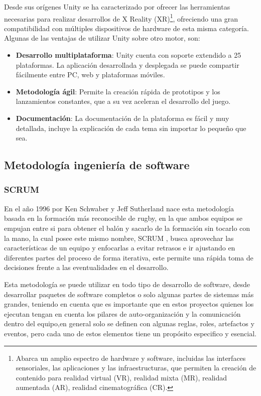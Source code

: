 Desde sus orígenes Unity se ha caracterizado por ofrecer las herramientas necesarias para realizar desarrollos de X Reality (XR)\footnote{Abarca un amplio espectro de hardware y software, incluidas las interfaces sensoriales, las aplicaciones y las infraestructuras, que permiten la creación de contenido para realidad virtual (VR), realidad mixta (MR), realidad aumentada (AR), realidad cinematográfica (CR).}, ofreciendo una gran compatibilidad con múltiples dispositivos de hardware de esta misma categoría. Algunas de las ventajas de utilizar Unity sobre otro motor, son:
\begin{itemize}
    \item \textbf{Desarrollo multiplataforma}: Unity cuenta con soporte extendido a 25 plataformas.\parencite{UnityTechnologies2018UnityPlatforms} La aplicación desarrollada y desplegada se puede compartir fácilmente entre PC, web y plataformas móviles. 
    \item \textbf{Metodología ágil}: Permite la creación rápida de prototipos y los lanzamientos constantes, que a su vez aceleran el desarrollo del juego.
    \item \textbf{Documentación}: La documentación de la plataforma es fácil y muy detallada, incluye la explicación de cada tema sin importar lo pequeño que sea.
    
\end{itemize}
    
\subsection{Metodología ingeniería de software}
\subsubsection{SCRUM}

En el año 1996 por Ken Schwaber y Jeff Sutherland nace esta metodología basada en la formación más reconocible de rugby, en la que ambos equipos se empujan entre si para obtener el balón y sacarlo de la formación sin tocarlo con la mano, la cual posee este mismo nombre, SCRUM \parencite{AlexanderMenzinskyGertrudisLopez2016ScrumManage}, busca aprovechar las características de un equipo y enfocarlas a evitar retrasos  e ir ajustando en diferentes partes del proceso de forma iterativa, este permite una rápida toma de decisiones frente a las eventualidades en el desarrollo.


Esta metodología se puede utilizar en todo tipo de desarrollo de software, desde desarrollar paquetes de software completos o solo algunas partes de sistemas más grandes, teniendo en cuenta que es importante que en estos proyectos quienes los ejecutan tengan en cuenta los pilares de auto-organización y la comunicación dentro del equipo,en general solo se definen con algunas reglas, roles, artefactos y eventos, pero cada uno de estos elementos tiene un propósito especifico y esencial.

